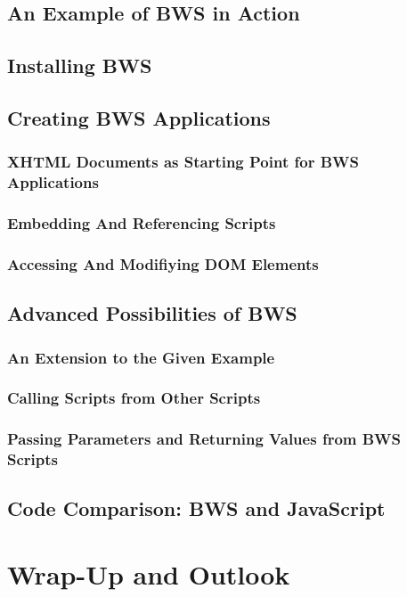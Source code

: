  \subsection{An Example of BWS in Action}
 \subsection{Installing BWS}
 \subsection{Creating BWS Applications}
 
  \subsubsection{XHTML Documents as Starting Point for BWS Applications}

  

  \subsubsection{Embedding And Referencing Scripts}

 

  \subsubsection{Accessing And Modifiying DOM Elements}


 \subsection{Advanced Possibilities of BWS}
  \subsubsection{An Extension to the Given Example}
  \subsubsection{Calling Scripts from Other Scripts}
  \subsubsection{Passing Parameters and Returning Values from BWS Scripts}
 \subsection{Code Comparison: BWS and JavaScript}
\section{Wrap-Up and Outlook}